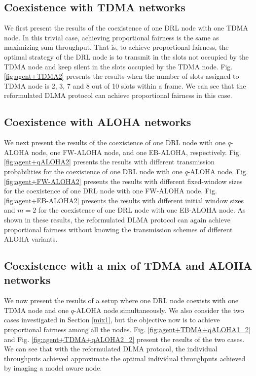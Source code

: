 \documentclass[journal,comsoc]{IEEEtran}
\begin{document}
\subsection{Coexistence with TDMA networks}
We first present the results of the coexistence of one DRL node with one TDMA node. In this trivial case, achieving proportional fairness is the same as maximizing sum throughput. That is, to achieve proportional fairness, the optimal strategy of the DRL node is to transmit in the slots not occupied by the TDMA node and keep silent in the slots occupied by the TDMA node.  Fig. \ref{fig:agent+TDMA2} presents the results when the number of slots assigned to TDMA node is 2, 3, 7 and 8 out of 10 slots within a frame. We can see that the reformulated DLMA protocol can achieve proportional fairness in this case. 
\subsection{Coexistence with ALOHA networks}
We next present the results of the coexistence of one DRL node with one  $ q $-ALOHA node, one FW-ALOHA node, and one EB-ALOHA, respectively. Fig. \ref{fig:agent+qALOHA2} presents the results with different transmission probabilities for the coexistence of one DRL node with one  $ q $-ALOHA node. Fig. \ref{fig:agent+FW-ALOHA2} presents the results with different fixed-window sizes for the coexistence of one DRL node with one FW-ALOHA node. Fig. \ref{fig:agent+EB-ALOHA2} presents the results with different initial window sizes and   $ m=2 $ for the coexistence of one DRL node with one EB-ALOHA node. As shown in these results, the reformulated DLMA protocol can again achieve proportional fairness without knowing the transmission schemes of different ALOHA variants. 
\subsection{Coexistence with a mix of TDMA and ALOHA networks}
We now present the results of a setup where one DRL node coexists with one TDMA node and one  $ q $-ALOHA node simultaneously. We also consider the two cases investigated in Section \ref{mix1}, but the objective now is to achieve proportional fairness among all the nodes. Fig. \ref{fig:agent+TDMA+qALOHA1_2} and Fig. \ref{fig:agent+TDMA+qALOHA2_2} present the results of the two cases. We can see that with the reformulated DLMA protocol, the individual throughputs achieved approximate the optimal individual throughputs achieved by imaging a model aware node.  
\end{document}

